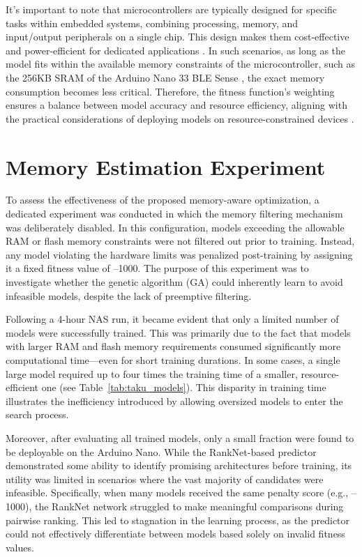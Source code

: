 It's important to note that microcontrollers are typically designed for specific tasks within embedded systems, combining processing, memory, and input/output peripherals on a single chip. This design makes them cost-effective and power-efficient for dedicated applications . In such scenarios, as long as the model fits within the available memory constraints of the microcontroller, such as the 256KB SRAM of the Arduino Nano 33 BLE Sense , the exact memory consumption becomes less critical. Therefore, the fitness function's weighting ensures a balance between model accuracy and resource efficiency, aligning with the practical considerations of deploying models on resource-constrained devices \cite{arduino_nano33ble}.



\section{Memory Estimation Experiment}

To assess the effectiveness of the proposed memory-aware optimization, a dedicated experiment was conducted in which the memory filtering mechanism was deliberately disabled. In this configuration, models exceeding the allowable RAM or flash memory constraints were not filtered out prior to training. Instead, any model violating the hardware limits was penalized post-training by assigning it a fixed fitness value of –1000. The purpose of this experiment was to investigate whether the genetic algorithm (GA) could inherently learn to avoid infeasible models, despite the lack of preemptive filtering.

Following a 4-hour NAS run, it became evident that only a limited number of models were successfully trained. This was primarily due to the fact that models with larger RAM and flash memory requirements consumed significantly more computational time—even for short training durations. In some cases, a single large model required up to four times the training time of a smaller, resource-efficient one (see Table~\ref{tab:taku_models}). This disparity in training time illustrates the inefficiency introduced by allowing oversized models to enter the search process.

Moreover, after evaluating all trained models, only a small fraction were found to be deployable on the Arduino Nano. While the RankNet-based predictor demonstrated some ability to identify promising architectures before training, its utility was limited in scenarios where the vast majority of candidates were infeasible. Specifically, when many models received the same penalty score (e.g., –1000), the RankNet network struggled to make meaningful comparisons during pairwise ranking. This led to stagnation in the learning process, as the predictor could not effectively differentiate between models based solely on invalid fitness values.

